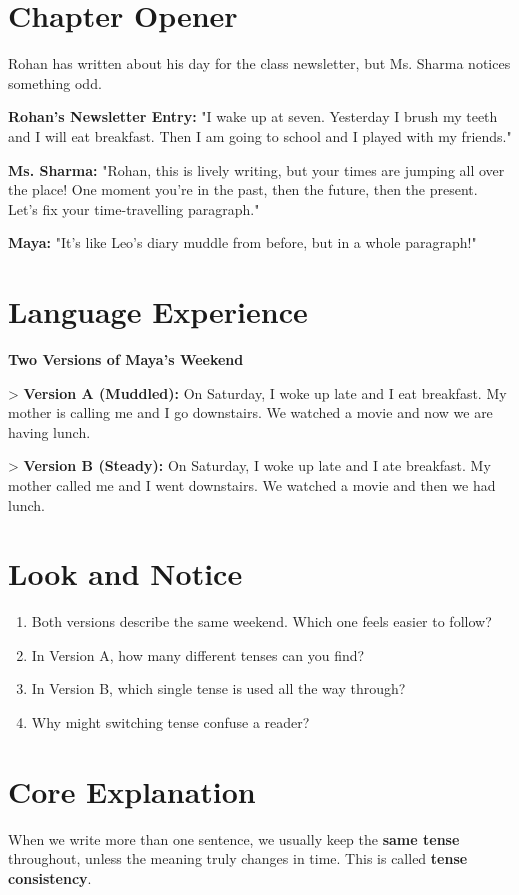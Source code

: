 \section{Chapter Opener}
Rohan has written about his day for the class newsletter, but Ms. Sharma notices something odd.

\textbf{Rohan's Newsletter Entry:} "I wake up at seven. Yesterday I brush my teeth and I will eat breakfast. Then I am going to school and I played with my friends."

\textbf{Ms. Sharma:} "Rohan, this is lively writing, but your times are jumping all over the place! One moment you're in the past, then the future, then the present. Let's fix your time-travelling paragraph."

\textbf{Maya:} "It's like Leo's diary muddle from before, but in a whole paragraph!"

\section{Language Experience}
\textbf{Two Versions of Maya's Weekend}

> \textbf{Version A (Muddled):} On Saturday, I woke up late and I eat breakfast. My mother is calling me and I go downstairs. We watched a movie and now we are having lunch.

> \textbf{Version B (Steady):} On Saturday, I woke up late and I ate breakfast. My mother called me and I went downstairs. We watched a movie and then we had lunch.

\section{Look and Notice}
\begin{thinkbox}
\begin{enumerate}
    \item Both versions describe the same weekend. Which one feels easier to follow?
    \item In Version A, how many different tenses can you find?
    \item In Version B, which single tense is used all the way through?
    \item Why might switching tense confuse a reader?
\end{enumerate}
\end{thinkbox}
\section{Core Explanation}
When we write more than one sentence, we usually keep the \textbf{same tense} throughout, unless the meaning truly changes in time. This is called \textbf{tense consistency}.

